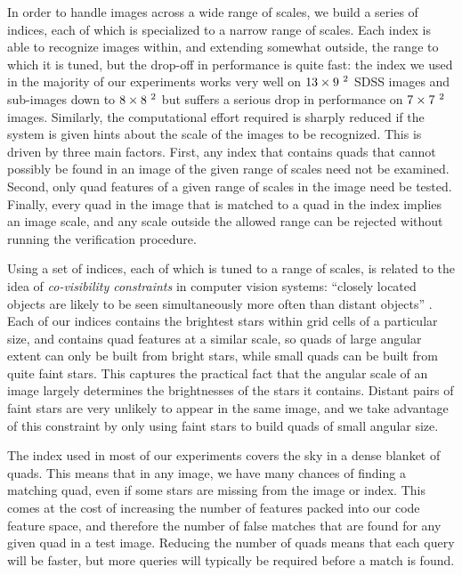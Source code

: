 In order to handle images across a wide range of scales, we build a
series of indices, each of which is specialized to a narrow range of
scales.  Each index is able to recognize images within, and extending
somewhat outside, the range to which it is tuned, but the drop-off in
performance is quite fast: the index we used in the majority of our
experiments works very well on $13\times9~^2$ SDSS images and
sub-images down to $8\times8~^2$ but suffers a serious drop in
performance on $7\times7~^2$ images.  Similarly, the
computational effort required is sharply reduced if the system is
given hints about the scale of the images to be recognized.  This is
driven by three main factors.  First, any index that contains quads
that cannot possibly be found in an image of the given range of scales
need not be examined.  Second, only quad features of a given range of
scales in the image need be tested.  Finally, every quad in the image
that is matched to a quad in the index implies an image scale, and any
scale outside the allowed range can be rejected without running the
verification procedure.


Using a set of indices, each of which is tuned to a range of scales,
is related to the idea of \emph{co-visibility constraints} in computer
vision systems: ``closely located objects are likely to be seen
simultaneously more often than distant objects'' \cite{yairi01}.  Each
of our indices contains the brightest stars within grid cells of a
particular size, and contains quad features at a similar scale, so
quads of large angular extent can only be built from bright stars,
while small quads can be built from quite faint stars.  This captures
the practical fact that the angular scale of an image largely
determines the brightnesses of the stars it contains.  Distant pairs
of faint stars are very unlikely to appear in the same image, and we
take advantage of this constraint by only using faint stars to build
quads of small angular size.


The index used in most of our experiments covers the sky in a dense
blanket of quads.  This means that in any image, we have many chances
of finding a matching quad, even if some stars are missing from the
image or index.  This comes at the cost of increasing the number of
features packed into our code feature space, and therefore the number
of false matches that are found for any given quad in a test image.
Reducing the number of quads means that each query will be faster, but
more queries will typically be required before a match is found.


